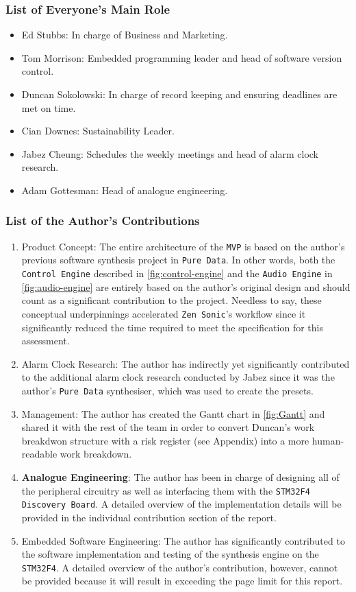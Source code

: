 \documentclass[12pt]{article}
\begin{document}
\subsubsection{List of Everyone's Main Role}
\begin{itemize}
\item Ed Stubbs: In charge of Business and Marketing.
\item Tom Morrison: Embedded programming leader and head of software version control.
\item Duncan Sokolowski: In charge of record keeping and ensuring deadlines are met on time.
\item Cian Downes: Sustainability Leader.
\item Jabez Cheung: Schedules the weekly meetings and head of alarm clock research.
\item Adam Gottesman: Head of analogue engineering.
\end{itemize}



\subsubsection{List of the Author's Contributions}
\begin{enumerate}
\item Product Concept: The entire architecture of the \texttt{MVP} is based on the author's previous software synthesis project in \texttt{Pure Data}. In other words, both the \texttt{Control Engine} described in \autoref{fig:control-engine} and the \texttt{Audio Engine} in \autoref{fig:audio-engine} are entirely based on the author's original design and should count as a significant contribution to the project. Needless to say, these conceptual underpinnings accelerated \texttt{Zen Sonic}'s workflow since it significantly reduced the time required to meet the specification for this assessment.
\item Alarm Clock Research: The author has indirectly yet significantly contributed to the additional alarm clock research conducted by Jabez since it was the author's \texttt{Pure Data} synthesiser, which was used to create the presets.
\item Management: The author has created the Gantt chart in \autoref{fig:Gantt} and shared it with the rest of the team in order to convert Duncan's work breakdwon structure with a risk register (see Appendix) into a more human-readable work breakdown. 
\item \textbf{Analogue Engineering}: The author has been in charge of designing all of the peripheral circuitry as well as interfacing them with the \texttt{STM32F4 Discovery Board}. A detailed overview of the implementation details will be provided in the individual contribution section of the report.
\item Embedded Software Engineering: The author has significantly contributed to the software implementation and testing of the synthesis engine on the \texttt{STM32F4}. A detailed overview of the author's contribution, however, cannot be provided because it will result in exceeding the page limit for this report.  
\end{enumerate}
\end{document}
